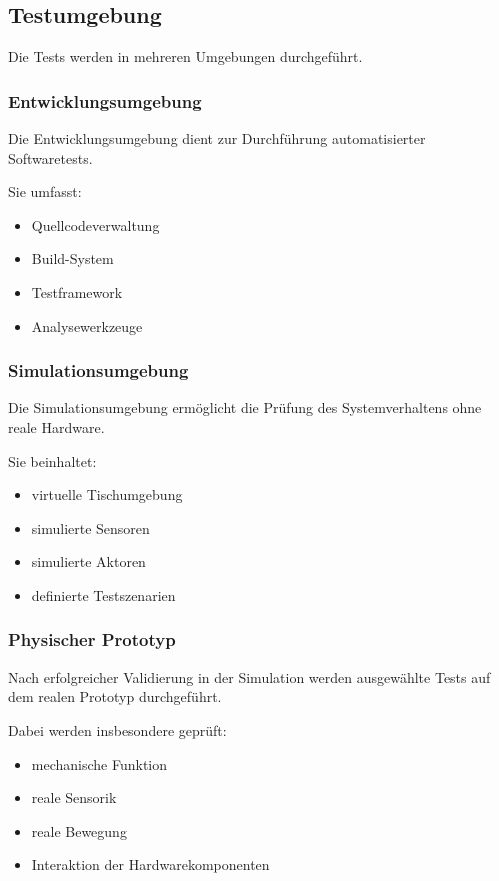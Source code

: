 \documentclass[
  a4paper,
  12pt,
  DIV=12,        %
  parskip=half,  %
  headings=small %
]{scrartcl}
\theoremstyle{definition}
\providecommand{\tightlist}{%
  \setlength{\itemsep}{0pt}\setlength{\parskip}{0pt}}
\theoremstyle{definition}
\begin{document}
\subsection{Testumgebung}\label{testumgebung}

Die Tests werden in mehreren Umgebungen durchgeführt.

\subsubsection{Entwicklungsumgebung}\label{entwicklungsumgebung}

Die Entwicklungsumgebung dient zur Durchführung automatisierter
Softwaretests.

Sie umfasst:

\begin{itemize}
\tightlist
\item
  Quellcodeverwaltung
\item
  Build-System
\item
  Testframework
\item
  Analysewerkzeuge
\end{itemize}

\subsubsection{Simulationsumgebung}\label{simulationsumgebung}

Die Simulationsumgebung ermöglicht die Prüfung des Systemverhaltens ohne
reale Hardware.

Sie beinhaltet:

\begin{itemize}
\tightlist
\item
  virtuelle Tischumgebung
\item
  simulierte Sensoren
\item
  simulierte Aktoren
\item
  definierte Testszenarien
\end{itemize}

\subsubsection{Physischer Prototyp}\label{physischer-prototyp}

Nach erfolgreicher Validierung in der Simulation werden ausgewählte
Tests auf dem realen Prototyp durchgeführt.

Dabei werden insbesondere geprüft:

\begin{itemize}
\tightlist
\item
  mechanische Funktion
\item
  reale Sensorik
\item
  reale Bewegung
\item
  Interaktion der Hardwarekomponenten
\end{itemize}
\end{document}

